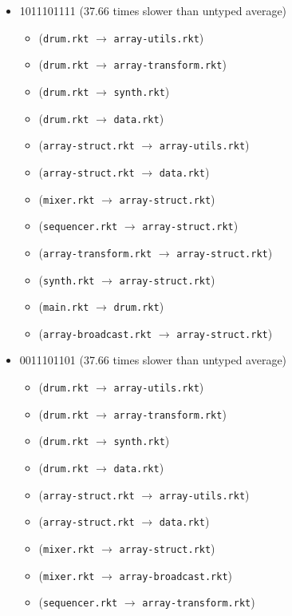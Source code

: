 \documentclass{article}
\newcommand{\mono}[1]{\texttt{#1}}
\begin{document}
\begin{itemize}
\begin{itemize}
  \end{itemize}
\item 1011101111 (37.66 times slower than untyped average)
  \begin{itemize}
  \item (\mono{drum.rkt} $\rightarrow$ \mono{array-utils.rkt})
  \item (\mono{drum.rkt} $\rightarrow$ \mono{array-transform.rkt})
  \item (\mono{drum.rkt} $\rightarrow$ \mono{synth.rkt})
  \item (\mono{drum.rkt} $\rightarrow$ \mono{data.rkt})
  \item (\mono{array-struct.rkt} $\rightarrow$ \mono{array-utils.rkt})
  \item (\mono{array-struct.rkt} $\rightarrow$ \mono{data.rkt})
  \item (\mono{mixer.rkt} $\rightarrow$ \mono{array-struct.rkt})
  \item (\mono{sequencer.rkt} $\rightarrow$ \mono{array-struct.rkt})
  \item (\mono{array-transform.rkt} $\rightarrow$ \mono{array-struct.rkt})
  \item (\mono{synth.rkt} $\rightarrow$ \mono{array-struct.rkt})
  \item (\mono{main.rkt} $\rightarrow$ \mono{drum.rkt})
  \item (\mono{array-broadcast.rkt} $\rightarrow$ \mono{array-struct.rkt})
  \end{itemize}
\item 0011101101 (37.66 times slower than untyped average)
  \begin{itemize}
  \item (\mono{drum.rkt} $\rightarrow$ \mono{array-utils.rkt})
  \item (\mono{drum.rkt} $\rightarrow$ \mono{array-transform.rkt})
  \item (\mono{drum.rkt} $\rightarrow$ \mono{synth.rkt})
  \item (\mono{drum.rkt} $\rightarrow$ \mono{data.rkt})
  \item (\mono{array-struct.rkt} $\rightarrow$ \mono{array-utils.rkt})
  \item (\mono{array-struct.rkt} $\rightarrow$ \mono{data.rkt})
  \item (\mono{mixer.rkt} $\rightarrow$ \mono{array-struct.rkt})
  \item (\mono{mixer.rkt} $\rightarrow$ \mono{array-broadcast.rkt})
  \item (\mono{sequencer.rkt} $\rightarrow$ \mono{array-transform.rkt})

\end{itemize}
\end{itemize}
\end{document}
